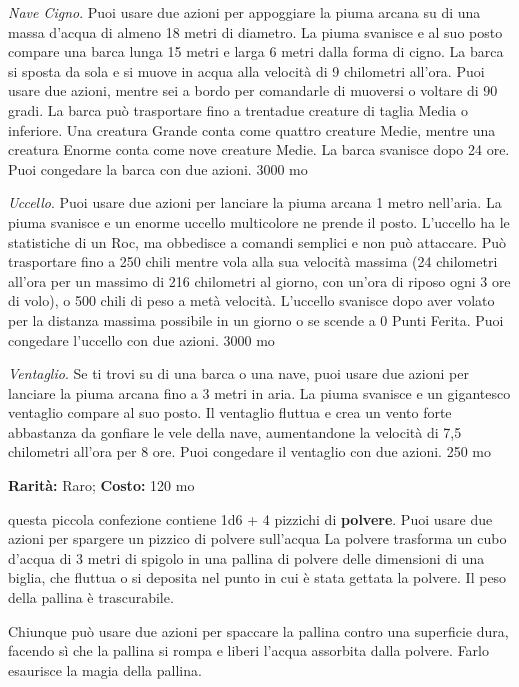 \begin{multicols}{2}
\emph{Nave Cigno}. Puoi usare due azioni per appoggiare la piuma arcana su di una massa d'acqua di almeno 18 metri di diametro. La piuma svanisce e al suo posto compare una barca lunga 15 metri e larga 6 metri dalla forma di cigno. La barca si sposta da sola e si muove in acqua alla velocità di 9 chilometri all'ora. Puoi usare due azioni, mentre sei a bordo per comandarle di muoversi o voltare di 90 gradi. La barca può trasportare fino a trentadue creature di taglia Media o inferiore. Una creatura Grande conta come quattro creature Medie, mentre una creatura Enorme conta come nove creature Medie. La barca svanisce dopo 24 ore. Puoi congedare la barca con due azioni. 3000 mo

\emph{Uccello}. Puoi usare due azioni per lanciare la piuma arcana 1 metro nell'aria. La piuma svanisce e un enorme uccello multicolore ne prende il posto. L'uccello ha le statistiche di un Roc, ma obbedisce a comandi semplici e non può attaccare. Può trasportare fino a 250 chili mentre vola alla sua velocità massima (24 chilometri all'ora per un massimo di 216 chilometri al giorno, con un'ora di riposo ogni 3 ore di volo), o 500 chili di peso a metà velocità. L'uccello svanisce dopo aver volato per la distanza massima possibile in un giorno o se scende a 0 Punti Ferita. Puoi congedare l'uccello con due azioni. 3000 mo

\emph{Ventaglio}. Se ti trovi su di una barca o una nave, puoi usare due azioni per lanciare la piuma arcana fino a 3 metri in aria. La piuma svanisce e un gigantesco ventaglio compare al suo posto. Il ventaglio fluttua e crea un vento forte abbastanza da gonfiare le vele della nave, aumentandone la velocità di 7,5 chilometri all'ora per 8 ore. Puoi congedare il ventaglio con due azioni. 250 mo


\textbf{Rarità:} Raro; \textbf{Costo:} 120 mo

questa piccola confezione contiene 1d6 + 4 pizzichi di \textbf{polvere}. Puoi usare due azioni per spargere un pizzico di polvere sull'acqua La polvere trasforma un cubo d'acqua di 3 metri di spigolo in una pallina di polvere delle dimensioni di una biglia, che fluttua o si deposita nel punto in cui è stata gettata la polvere. Il peso della pallina è trascurabile.

Chiunque può usare due azioni per spaccare la pallina contro una superficie dura, facendo sì che la pallina si rompa e liberi l'acqua assorbita dalla polvere. Farlo esaurisce la magia della pallina.


\end{multicols}
